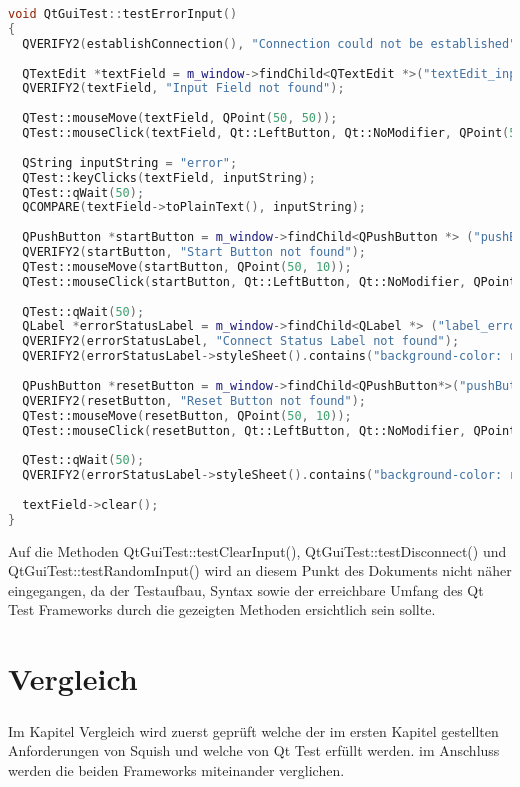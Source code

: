 		\begin{lstlisting}[language=C++, caption=qtguitest.cpp]
void QtGuiTest::testErrorInput()
{    
  QVERIFY2(establishConnection(), "Connection could not be established");
	
  QTextEdit *textField = m_window->findChild<QTextEdit *>("textEdit_input");
  QVERIFY2(textField, "Input Field not found");
	
  QTest::mouseMove(textField, QPoint(50, 50));
  QTest::mouseClick(textField, Qt::LeftButton, Qt::NoModifier, QPoint(50, 50));
	
  QString inputString = "error";
  QTest::keyClicks(textField, inputString);
  QTest::qWait(50);
  QCOMPARE(textField->toPlainText(), inputString);
	
  QPushButton *startButton = m_window->findChild<QPushButton *> ("pushButton_start");
  QVERIFY2(startButton, "Start Button not found");
  QTest::mouseMove(startButton, QPoint(50, 10));
  QTest::mouseClick(startButton, Qt::LeftButton, Qt::NoModifier, QPoint(50, 10));
	
  QTest::qWait(50);
  QLabel *errorStatusLabel = m_window->findChild<QLabel *> ("label_errorStatus");
  QVERIFY2(errorStatusLabel, "Connect Status Label not found");
  QVERIFY2(errorStatusLabel->styleSheet().contains("background-color: rgb(203, 47, 47)"), "Color of label_errorStatus is not Red");
	
  QPushButton *resetButton = m_window->findChild<QPushButton*>("pushButton_resetErrorAndEStop");
  QVERIFY2(resetButton, "Reset Button not found");
  QTest::mouseMove(resetButton, QPoint(50, 10));
  QTest::mouseClick(resetButton, Qt::LeftButton, Qt::NoModifier, QPoint(50, 10));
	
  QTest::qWait(50);
  QVERIFY2(errorStatusLabel->styleSheet().contains("background-color: rgb(27, 193, 00)"), "Color of label_errorStatus is not Green");
	
  textField->clear();
}
		\end{lstlisting}
	
		Auf die Methoden QtGuiTest::testClearInput(), QtGuiTest::testDisconnect() und 	QtGuiTest::testRandomInput() wird an diesem Punkt des Dokuments nicht näher eingegangen, da der Testaufbau, Syntax sowie der erreichbare Umfang des Qt Test Frameworks durch die gezeigten Methoden ersichtlich sein sollte.
		
\chapter{Vergleich}
	\paragraph{} Im Kapitel Vergleich wird zuerst geprüft welche der im ersten Kapitel gestellten Anforderungen von Squish und welche von Qt Test erfüllt werden. im Anschluss werden die beiden Frameworks miteinander verglichen.
